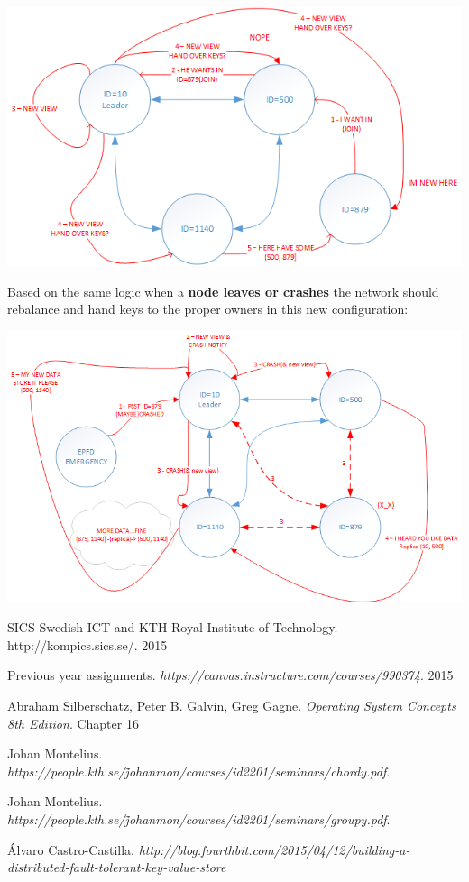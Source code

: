 \documentclass[a4paper, 11pt]{article}
\begin{document}
{\centering\includegraphics[scale = 0.90]{./figures/nodejoin.png}\par}

\clearpage

\noindent Based on the same logic when a \textbf{node leaves or crashes} the network should rebalance and hand keys to the proper owners in this new configuration:

\hspace*{-1in} {\centering\includegraphics[scale = 0.9]{./figures/nodecrash.png}\par}

\clearpage

\begin{thebibliography}{9}
	 SICS Swedish ICT and KTH Royal Institute of Technology.  http://kompics.sics.se/. 2015
	
	 Previous year assignments. \textit{https://canvas.instructure.com/courses/990374}. 2015
	
	  Abraham Silberschatz, Peter B. Galvin, Greg Gagne. \textit{Operating System Concepts 8th Edition}. Chapter 16 
	
	 Johan Montelius. \textit{https://people.kth.se/\~johanmon/courses/id2201/seminars/chordy.pdf}.
	
	 Johan Montelius. \textit{https://people.kth.se/\~johanmon/courses/id2201/seminars/groupy.pdf}.

	 Álvaro Castro-Castilla. \textit{http://blog.fourthbit.com/2015/04/12/building-a-distributed-fault-tolerant-key-value-store}
\end{thebibliography}
\end{document}
